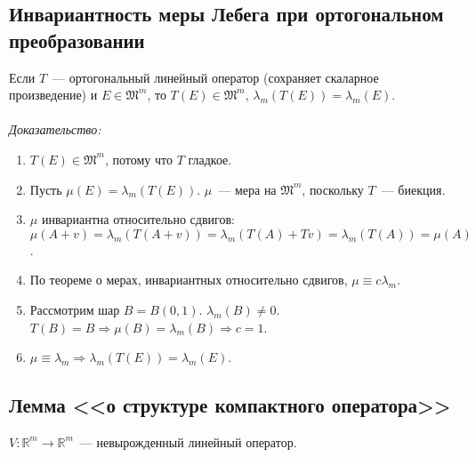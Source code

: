 \documentclass[paper=a4, fontsize=11pt]{article}
\begin{document}
\subsection{Инвариантность меры Лебега при ортогональном преобразовании}
Если $T$~--- ортогональный линейный оператор (сохраняет скаларное произведение) и $E \in \mathfrak{M}^m$,
то $T(E) \in \mathfrak{M}^m$, $\lambda_m(T(E))=\lambda_m(E)$.
\\\\
\emph{Доказательство:}
\begin{enumerate}
    \item $T(E) \in \mathfrak{M}^m$, потому что $T$ гладкое.
    \item Пусть $\mu(E) = \lambda_m(T(E))$. $\mu$~--- мера на $\mathfrak{M}^m$, поскольку $T$~--- биекция.
    \item $\mu$ инвариантна относительно сдвигов: $\mu(A+v) = \lambda_m(T(A+v)) = \lambda_m(T(A) + Tv) = \lambda_m(T(A)) = \mu(A)$.
    \item По теореме о мерах, инвариантных относительно сдвигов, $\mu \equiv c\lambda_m$.
    \item Рассмотрим шар $B = B(0,1)$. $\lambda_m(B) \neq 0$. $T(B) = B \Rightarrow \mu(B) = \lambda_m(B) \Rightarrow c=1$.
    \item $\mu \equiv \lambda_m \Rightarrow \lambda_m(T(E)) = \lambda_m(E)$.
\end{enumerate}

\subsection{Лемма <<о структуре компактного оператора>>}
$V: \mathds{R}^m \rightarrow \mathds{R}^m$~--- невырожденный линейный оператор.
\end{document}
